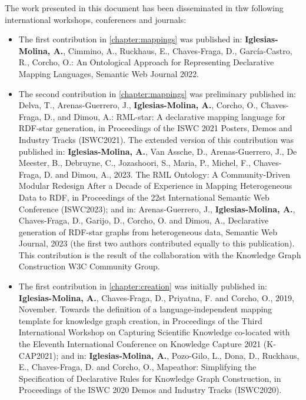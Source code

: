 The work presented in this document has been disseminated in thw following international workshops, conferences and journals:

\begin{itemize}
    \item The first contribution in \cref{chapter:mappings} was published in: \textbf{Iglesias-Molina, A.}, Cimmino, A., Ruckhaus, E., Chaves-Fraga, D., García-Castro, R., Corcho, O.: An Ontological Approach for Representing Declarative Mapping Languages, Semantic Web Journal 2022.
    
    \item The second contribution  in \cref{chapter:mappings} was preliminary published in: Delva, T., Arenas-Guerrero, J.,\textbf{ Iglesias-Molina, A.}, Corcho, O., Chaves-Fraga, D., and Dimou, A.: RML-star: A declarative mapping language for RDF-star generation, in Proceedings of the ISWC 2021 Posters, Demos and Industry Tracks (ISWC2021). The extended version of this contribution was published in: \textbf{Iglesias-Molina, A.}, Van Assche, D., Arenas-Guerrero, J., De Meester, B., Debruyne, C., Jozashoori, S., Maria, P., Michel, F., Chaves-Fraga, D. and Dimou, A., 2023. The RML Ontology: A Community-Driven Modular Redesign After a Decade of Experience in Mapping Heterogeneous Data to RDF, in Proceedings of the 22st International Semantic Web Conference (ISWC2023); and in: Arenas-Guerrero, J., \textbf{Iglesias-Molina, A.}, Chaves-Fraga, D., Garijo, D., Corcho, O. and Dimou, A., Declarative generation of RDF-star graphs from heterogeneous data, Semantic Web Journal, 2023 (the first two authors contributed equally to this publication). This contribution is the result of the collaboration with the Knowledge Graph Construction W3C Community Group. 

    \item The first contribution in \cref{chapter:creation} was initially published  in: \textbf{Iglesias-Molina, A.}, Chaves-Fraga, D., Priyatna, F. and Corcho, O., 2019, November. Towards the definition of a language-independent mapping template for knowledge graph creation, in Proceedings of the Third International Workshop on Capturing Scientific Knowledge co-located with the Eleventh International Conference on Knowledge Capture 2021 (K-CAP2021); and in: \textbf{Iglesias-Molina, A.}, Pozo-Gilo, L., Dona, D., Ruckhaus, E., Chaves-Fraga, D. and Corcho, O., Mapeathor: Simplifying the Specification of Declarative Rules for Knowledge Graph Construction, in Proceedings of the ISWC 2020 Demos and Industry Tracks (ISWC2020).


\end{itemize}
